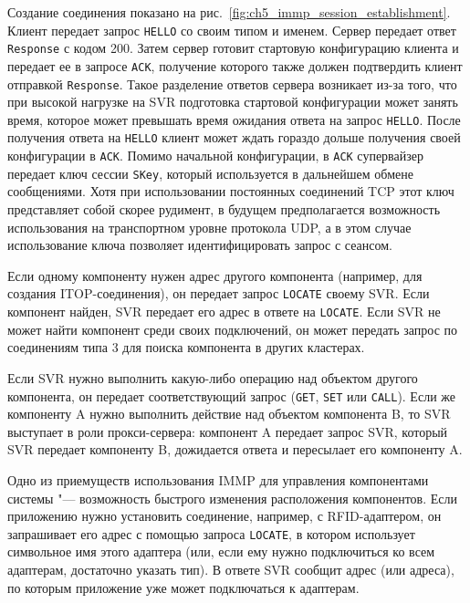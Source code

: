Создание соединения показано на рис.~\ref{fig:ch5_immp_session_establishment}. Клиент передает запрос \texttt{HELLO} со своим типом и именем. Сервер передает ответ \texttt{Response} с кодом 200. Затем сервер готовит стартовую конфигурацию клиента и передает ее в запросе \texttt{ACK}, получение которого также должен подтвердить клиент отправкой \texttt{Response}. Такое разделение ответов сервера возникает из-за того, что при высокой нагрузке на SVR подготовка стартовой конфигурации может занять время, которое может превышать время ожидания ответа на запрос \texttt{HELLO}. После получения ответа на \texttt{HELLO} клиент может ждать гораздо дольше получения своей конфигурации в \texttt{ACK}. Помимо начальной конфигурации, в \texttt{ACK} супервайзер передает ключ сессии \texttt{SKey}, который используется в дальнейшем обмене сообщениями. Хотя при использовании постоянных соединений TCP этот ключ представляет собой скорее рудимент, в будущем предполагается возможность использования на транспортном уровне протокола UDP, а в этом случае использование ключа позволяет идентифицировать запрос с сеансом.

Если одному компоненту нужен адрес другого компонента (например, для создания ITOP-соединения), он передает запрос \texttt{LOCATE} своему SVR. Если компонент найден, SVR передает его адрес в ответе на \texttt{LOCATE}. Если SVR не может найти компонент среди своих подключений, он может передать запрос по соединениям типа 3 для поиска компонента в других кластерах.

Если SVR нужно выполнить какую-либо операцию над объектом другого компонента, он передает соответствующий запрос (\texttt{GET}, \texttt{SET} или \texttt{CALL}). Если же компоненту A нужно выполнить действие над объектом компонента B, то SVR выступает в роли прокси-сервера: компонент A передает запрос SVR, который SVR передает компоненту B, дожидается ответа и пересылает его компоненту A.

Одно из приемуществ использования IMMP для управления компонентами системы "--- возможность быстрого изменения расположения компонентов. Если приложению нужно установить соединение, например, с RFID-адаптером, он запрашивает его адрес с помощью запроса \texttt{LOCATE}, в котором использует символьное имя этого адаптера (или, если ему нужно подключиться ко всем адаптерам, достаточно указать тип). В ответе SVR сообщит адрес (или адреса), по которым приложение уже может подключаться к адаптерам.



